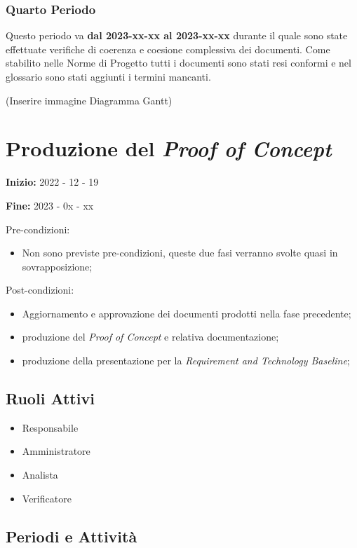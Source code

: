 \subsubsection{Quarto Periodo}
Questo periodo va \textbf{dal 2023-xx-xx al 2023-xx-xx} durante il quale sono state effettuate verifiche di coerenza e coesione complessiva dei documenti. Come stabilito nelle Norme di Progetto tutti i documenti sono stati resi conformi e nel glossario sono stati aggiunti i termini mancanti.

(Inserire immagine Diagramma Gantt)

\section{Produzione del {\it{Proof of Concept}}}

\textbf{Inizio:} 2022 - 12 - 19 

\textbf{Fine:} 2023 - 0x - xx

Pre-condizioni:
\begin{itemize}
    \item Non sono previste pre-condizioni, queste due fasi verranno svolte quasi in sovrapposizione;
\end{itemize}

Post-condizioni:
    \begin{itemize}
        \item Aggiornamento e approvazione dei documenti prodotti nella fase precedente;
        \item produzione del {\it{Proof of Concept}} e relativa documentazione;
        \item produzione della presentazione per la {\it{Requirement and Technology Baseline}};
    \end{itemize}

\subsection{Ruoli Attivi}
\begin{itemize}
    \item Responsabile
    \item Amministratore
    \item Analista
    \item Verificatore
\end{itemize}

\subsection{Periodi e Attività}


